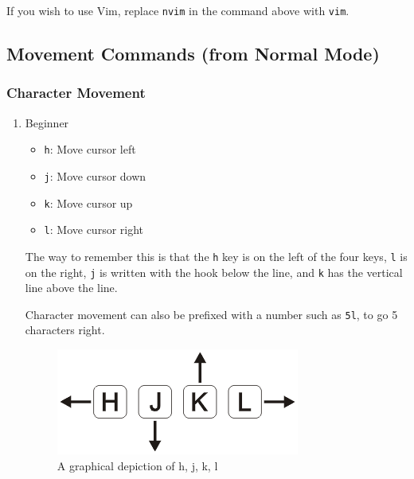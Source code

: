 \documentclass[11pt]{article}
\begin{document}
If you wish to use Vim, replace \texttt{nvim} in the command above with \texttt{vim}.
\subsection{Movement Commands (from Normal Mode)}
\label{sec:org717346b}
\subsubsection{Character Movement}
\label{sec:org8c3ffc2}
\begin{enumerate}
\item Beginner
\label{sec:org2488c36}
\begin{itemize}
\item \texttt{h}: Move cursor left
\item \texttt{j}: Move cursor down
\item \texttt{k}: Move cursor up
\item \texttt{l}: Move cursor right
\end{itemize}

The way to remember this is that the \texttt{h} key is on the left of the four keys,
\texttt{l} is on the right, \texttt{j} is written with the hook below the line, and \texttt{k} has
the vertical line above the line.

Character movement can also be prefixed with a number such as \texttt{5l}, to go
5 characters right.

\begin{figure}[htbp]
\centering
\includegraphics[width=.9\linewidth]{./hjkl.png}
\caption{\label{fig:org84eb0a9}
A graphical depiction of h, j, k, l}
\end{figure}
\end{enumerate}
\end{document}
